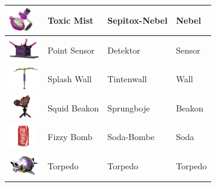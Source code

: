 \documentclass{scrreprt}
\begin{document}
\begin{center}
\begin{longtable}{|m{3.5cm}|m{4cm}|m{4cm}|m{2cm}|}
		\includegraphics[height=1cm]{img/toxicmist.png} & Toxic Mist & Sepitox-Nebel & Nebel \\ \hline
		\includegraphics[height=1cm]{img/pointsensor.png} & Point Sensor & Detektor & Sensor \\ \hline
		\includegraphics[height=1cm]{img/splashwall.png} & Splash Wall & Tintenwall & Wall \\ \hline
		\includegraphics[height=1cm]{img/squidbeakon.png} & Squid Beakon & Sprungboje & Beakon \\ \hline
		\includegraphics[height=1cm]{img/fizzybomb.png} & Fizzy Bomb & Soda-Bombe & Soda \\ \hline
		\includegraphics[height=1cm]{img/torpedo.png} & Torpedo & Torpedo & Torpedo \\ \hline
	\end{longtable}
\end{center}
\newpage
\end{document}
